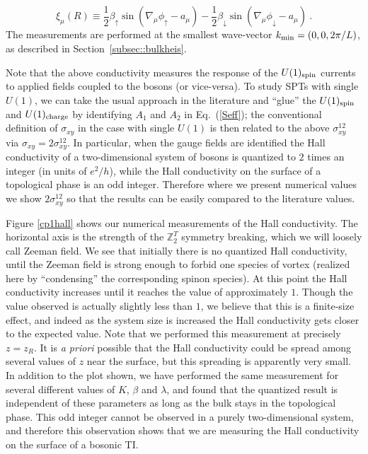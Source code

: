 \documentclass[prb,twocolumn]{revtex4-1}
\def\ztwot{\mathbb{Z}_2^T}
\begin{document}
\begin{equation}
\xi_\mu(R)\equiv\frac{1}{2}\beta_\uparrow\sin(\nabla_\mu\phi_\uparrow-a_\mu)-\frac{1}{2}\beta_\downarrow\sin(\nabla_\mu\phi_\downarrow-a_\mu)\nonumber ~.
\end{equation}
The measurements are performed at the smallest wave-vector $k_{\rm min}=(0,0, 2\pi/L)$, as described in Section~\ref{subsec::bulkheis}. 

Note that the above conductivity measures the response of the $U(1)_{\rm spin}$ currents to applied fields coupled to the bosons (or vice-versa). To study SPTs with single $U(1)$, we can take the usual approach in the literature\cite{SenthilVishwanath} and ``glue'' the $U(1)_{\rm spin}$ and $U(1)_{\rm charge}$ by identifying $A_1$ and $A_2$ in Eq.~(\ref{Seff}); the conventional definition of $\sigma_{xy}$ in the case with single $U(1)$ is then related to the above $\sigma_{xy}^{12}$ via  $\sigma_{xy} = 2 \sigma_{xy}^{12}$. %
In particular, when the gauge fields are identified the Hall conductivity of a two-dimensional system of bosons is quantized to $2$ times an integer (in units of $e^2/h$), while the Hall conductivity on the surface of a topological phase is an odd integer. Therefore where we present numerical values we show $2 \sigma^{12}_{xy}$ so that the results can be easily compared to the literature values.


Figure \ref{cp1hall} shows our numerical measurements of the Hall conductivity. The horizontal axis is the strength of the $\ztwot$ symmetry breaking, which we will loosely call Zeeman field. We see that initially there is no quantized Hall conductivity, until the Zeeman field is strong enough to forbid one species of vortex (realized here by ``condensing'' the corresponding spinon species). At this point the Hall conductivity increases until it reaches the value of approximately $1$. Though the value observed is actually slightly less than $1$, we believe that this is a finite-size effect, and indeed as the system size is increased the Hall conductivity gets closer to the expected value.  Note that we performed this measurement at precisely $z=z_R$.  It is {\em a priori} possible that the Hall conductivity could be spread among several values of $z$ near the surface, but this spreading is apparently very small. In addition to the plot shown, we have performed the same measurement for several different values of $K$, $\beta$ and $\lambda$, and found that the quantized result is independent of these parameters as long as the bulk stays in the topological phase. This odd integer cannot be observed in a purely two-dimensional system, and therefore this observation shows that we are measuring the Hall conductivity on the surface of a bosonic TI.
\end{document}

